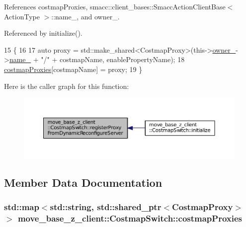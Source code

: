 References costmap\+Proxies, smacc\+::client\+\_\+bases\+::\+Smacc\+Action\+Client\+Base$<$ Action\+Type $>$\+::name\+\_\+, and owner\+\_\+.



Referenced by initialize().


\begin{DoxyCode}
15 \{
16 
17     \textcolor{keyword}{auto} proxy = std::make\_shared<CostmapProxy>(this->\hyperlink{classmove__base__z__client_1_1CostmapSwitch_a00517c28045327007d7b9335c9b433ed}{owner\_}->\hyperlink{classsmacc_1_1client__bases_1_1SmaccActionClientBase_a7f2e1834e915bdf7ae9db8b90b4597e6}{name\_} + \textcolor{stringliteral}{"/"} + costmapName, 
      enablePropertyName);
18     \hyperlink{classmove__base__z__client_1_1CostmapSwitch_ab9b33bc5774b41e5898718ffdcfcbc25}{costmapProxies}[costmapName] = proxy;
19 \}
\end{DoxyCode}


Here is the caller graph for this function\+:
\nopagebreak
\begin{figure}[H]
\begin{center}
\leavevmode
\includegraphics[width=350pt]{classmove__base__z__client_1_1CostmapSwitch_a0282cb1651dd50803e3af0de1436635f_icgraph}
\end{center}
\end{figure}




\subsection{Member Data Documentation}
\subsubsection[{\texorpdfstring{costmap\+Proxies}{costmapProxies}}]{\setlength{\rightskip}{0pt plus 5cm}std\+::map$<$std\+::string, std\+::shared\+\_\+ptr$<${\bf Costmap\+Proxy}$>$ $>$ move\+\_\+base\+\_\+z\+\_\+client\+::\+Costmap\+Switch\+::costmap\+Proxies\hspace{0.3cm}{\ttfamily [private]}}\hypertarget{classmove__base__z__client_1_1CostmapSwitch_ab9b33bc5774b41e5898718ffdcfcbc25}{}\label{classmove__base__z__client_1_1CostmapSwitch_ab9b33bc5774b41e5898718ffdcfcbc25}


